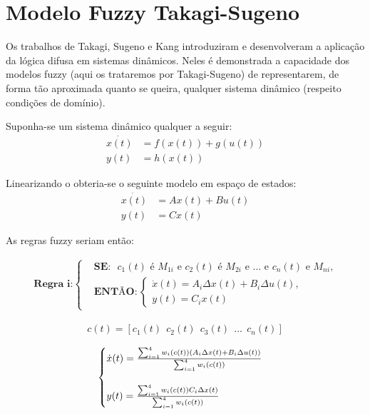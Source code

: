 \section{Modelo Fuzzy Takagi-Sugeno} \label{secTakSug}
Os trabalhos de Takagi, Sugeno \cite{takagiSugeno} e Kang \cite{kang} introduziram e desenvolveram a aplicação da lógica difusa em sistemas dinâmicos. Neles é demonstrada a capacidade dos modelos fuzzy (aqui os trataremos por Takagi-Sugeno) de representarem, de forma tão aproximada quanto se queira, qualquer sistema dinâmico (respeito condições de domínio). 

Suponha-se um sistema dinâmico qualquer a seguir:
\begin{align*}
	\dot{x(t)} &= f(x(t)) + g(u(t)) \\
	y(t) &= h(x(t))
\end{align*}

Linearizando o obteria-se o seguinte modelo em espaço de estados:
\begin{align*}
	\dot{x(t)} &= Ax(t) + Bu(t) \\
	y(t) &= Cx(t)
\end{align*}

As regras fuzzy seriam então:


\begin{align} \label{eqRegraIGeral}
	\textbf{Regra i:}
	\begin{cases}
		&\textbf{SE:} \text{ $c_1(t)$ é $M_{1i}$ e $c_2(t)$ é $M_{2i}$ e ... e $c_n(t)$ e $M_{ni}$,} \\
		&\textbf{ENTÃO}:
		\begin{cases}
			\dot{x}(t) = A_i \Delta x(t) + B_i \Delta u(t),\\
			y(t) = C_ix(t)
		\end{cases}
	\end{cases}
\end{align}

\begin{align}
	c(t) = [c_1(t) \ \ c_2(t) \ \ c_3(t) \ \ ... \ \ c_n(t)]
\end{align}
	
\begin{align}
	\begin{cases}
		\dot{x}(t) = \frac{\sum_{i=1}^{4}  w_i(c(t))(A_i \Delta x(t) +  B_i \Delta u(t))}{\sum_{i=1}^{4} w_i(c(t))} \vspace{0.5cm}\\
		y(t) = \frac{\sum_{i=1}^{4}  w_i(c(t)) C_i \Delta x(t)}{\sum_{i=1}^{4} w_i(c(t))}
	\end{cases}
\end{align}

%

